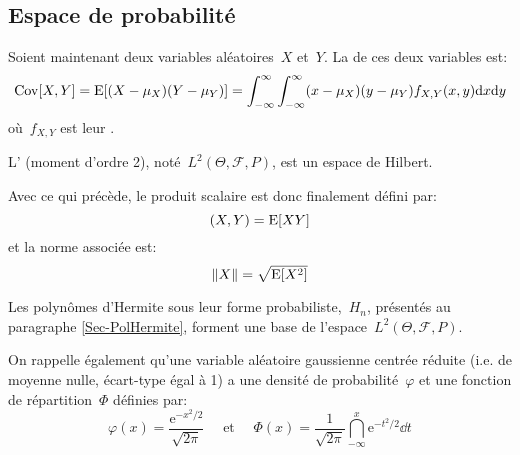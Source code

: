 \medskip
\subsection{Espace de probabilité}

Soient maintenant deux variables aléatoires~$X$ et~$Y$.
La  de ces deux variables est:
\begin{equation}
\operatorname{Cov}[X,Y]=\operatorname{E}[(X-\mu_X)(Y-\mu_Y)]=\displaystyle\int_{-\infty}^\infty\displaystyle\int_{-\infty}^\infty(x-\mu_X)(y-\mu_Y)f_{X,Y}(x,y)\text{d} x\text{d} y
\end{equation}
où~$f_{X,Y}$ est leur .

\medskip
\begin{definition}
L' (moment d'ordre 2), noté~$L^2(\Theta,\mathcal{F},P)$, est un espace de Hilbert.

Avec ce qui précède, le produit scalaire est donc finalement défini par:
\begin{equation}\label{Eq_StoPS}
(X,Y)=\operatorname{E}[XY]
\end{equation}
et la norme associée est:
\begin{equation}
\|X\|=\sqrt{\operatorname{E}[X^2]}
\end{equation}
\end{definition}

\begin{theoreme}
Les polynômes d'Hermite sous leur forme probabiliste,~$H_n$, présentés au paragraphe \ref{Sec-PolHermite}, forment une base de l'espace~$L^2(\Theta,\mathcal{F},P)$.
\end{theoreme}

On rappelle également qu'une variable aléatoire gaussienne centrée réduite (i.e. de moyenne nulle, écart-type égal à 1) a une densité de probabilité~$\varphi$ et une fonction de répartition~$\Phi$ définies par:
\begin{equation}
\varphi(x) =\frac{\mathrm{e}^{-x^2/2}}{\sqrt{2\pi}} \quad \text{ et } \quad
\Phi(x) = \dfrac1{\sqrt{2\pi}}\dint_{-\infty}^x \mathrm{e}^{-t^2/2} \dd t
\end{equation}

